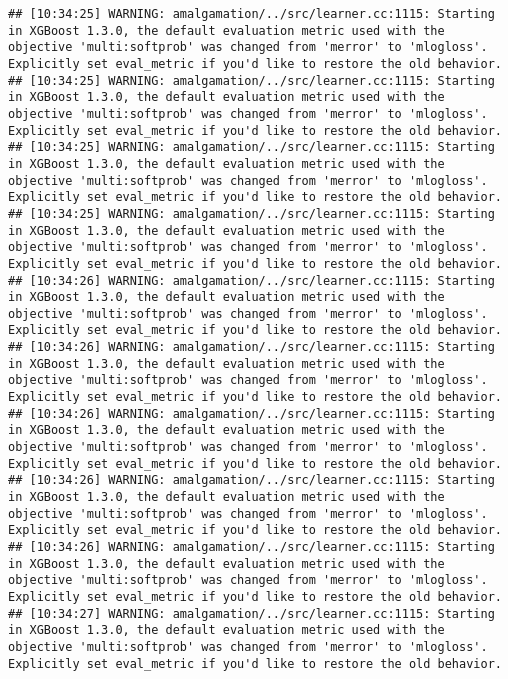 \documentclass[
]{scrbook}
\begin{document}
\begin{verbatim}
## [10:34:25] WARNING: amalgamation/../src/learner.cc:1115: Starting in XGBoost 1.3.0, the default evaluation metric used with the objective 'multi:softprob' was changed from 'merror' to 'mlogloss'. Explicitly set eval_metric if you'd like to restore the old behavior.
## [10:34:25] WARNING: amalgamation/../src/learner.cc:1115: Starting in XGBoost 1.3.0, the default evaluation metric used with the objective 'multi:softprob' was changed from 'merror' to 'mlogloss'. Explicitly set eval_metric if you'd like to restore the old behavior.
## [10:34:25] WARNING: amalgamation/../src/learner.cc:1115: Starting in XGBoost 1.3.0, the default evaluation metric used with the objective 'multi:softprob' was changed from 'merror' to 'mlogloss'. Explicitly set eval_metric if you'd like to restore the old behavior.
## [10:34:25] WARNING: amalgamation/../src/learner.cc:1115: Starting in XGBoost 1.3.0, the default evaluation metric used with the objective 'multi:softprob' was changed from 'merror' to 'mlogloss'. Explicitly set eval_metric if you'd like to restore the old behavior.
## [10:34:26] WARNING: amalgamation/../src/learner.cc:1115: Starting in XGBoost 1.3.0, the default evaluation metric used with the objective 'multi:softprob' was changed from 'merror' to 'mlogloss'. Explicitly set eval_metric if you'd like to restore the old behavior.
## [10:34:26] WARNING: amalgamation/../src/learner.cc:1115: Starting in XGBoost 1.3.0, the default evaluation metric used with the objective 'multi:softprob' was changed from 'merror' to 'mlogloss'. Explicitly set eval_metric if you'd like to restore the old behavior.
## [10:34:26] WARNING: amalgamation/../src/learner.cc:1115: Starting in XGBoost 1.3.0, the default evaluation metric used with the objective 'multi:softprob' was changed from 'merror' to 'mlogloss'. Explicitly set eval_metric if you'd like to restore the old behavior.
## [10:34:26] WARNING: amalgamation/../src/learner.cc:1115: Starting in XGBoost 1.3.0, the default evaluation metric used with the objective 'multi:softprob' was changed from 'merror' to 'mlogloss'. Explicitly set eval_metric if you'd like to restore the old behavior.
## [10:34:26] WARNING: amalgamation/../src/learner.cc:1115: Starting in XGBoost 1.3.0, the default evaluation metric used with the objective 'multi:softprob' was changed from 'merror' to 'mlogloss'. Explicitly set eval_metric if you'd like to restore the old behavior.
## [10:34:27] WARNING: amalgamation/../src/learner.cc:1115: Starting in XGBoost 1.3.0, the default evaluation metric used with the objective 'multi:softprob' was changed from 'merror' to 'mlogloss'. Explicitly set eval_metric if you'd like to restore the old behavior.

\end{verbatim}
\end{document}
